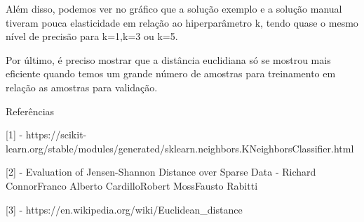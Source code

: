 \documentclass{article}
\begin{document}
\vspace{1.0cm}

Além disso, podemos ver no gráfico que a solução exemplo e a solução manual tiveram pouca elasticidade em relação ao hiperparâmetro k, tendo quase o mesmo nível de precisão para k=1,k=3 ou k=5. 

\vspace{1.0cm}


Por último, é preciso mostrar que a distância euclidiana só se mostrou mais eficiente quando temos um grande número de amostras para treinamento em relação as amostras para validação.

\vspace{1.0cm}


Referências

\vspace{1.0cm}


[1] - https://scikit-learn.org/stable/modules/generated/sklearn.neighbors.KNeighborsClassifier.html

\vspace{1.0cm}


[2] - Evaluation of Jensen-Shannon Distance over Sparse Data - Richard ConnorFranco Alberto CardilloRobert MossFausto Rabitti

\vspace{1.0cm}

[3] - https://en.wikipedia.org/wiki/Euclidean_distance
\end{document}
